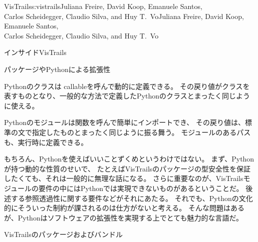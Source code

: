 \begin{aosachaptertoc}{VisTrails}{s:vistrails}{Juliana Freire, David Koop, Emanuele Santos, \\ Carlos Scheidegger, Claudio Silva, and Huy T.\ Vo}{Juliana Freire, David Koop, Emanuele Santos, \\ \hspace*{0.9cm} Carlos Scheidegger, Claudio Silva, and Huy T.\ Vo}
\begin{aosasect1}{インサイドVisTrails}
\begin{aosasect2}{パッケージやPythonによる拡張性}
\begin{aosaitemize}
  \item Pythonのクラスは callableを呼んで動的に定義できる。
  その戻り値がクラスを表すものとなり、一般的な方法で定義したPythonのクラスとまったく同じように使える。

  \item Pythonのモジュールは関数を呼んで簡単にインポートでき、
  その戻り値は、標準の文で指定したものとまったく同じように振る舞う。
  モジュールのあるパスも、実行時に定義できる。

\end{aosaitemize}

もちろん、Pythonを使えばいいことずくめというわけではない。
まず、Pythonが持つ動的な性質のせいで、
たとえばVisTrailsのパッケージの型安全性を保証したくても、それは一般的に無理な話になる。
さらに重要なのが、VisTrailsモジュールの要件の中にはPythonでは実現できないものがあるということだ。
後述する参照透過性に関する要件などがそれにあたる。
それでも、Pythonの文化的にそういった制約が課されるのは仕方がないと考える。
そんな問題はあるが、Pythonはソフトウェアの拡張性を実現する上でとても魅力的な言語だ。

\end{aosasect2}

\begin{aosasect2}{VisTrailsのパッケージおよびバンドル}


\end{aosasect2}
\end{aosasect1}
\end{aosachaptertoc}
